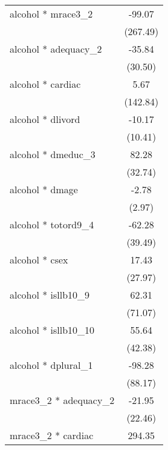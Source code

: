 {\begin{tabular}{l*{1}{c}}
alcohol * mrace3\_2                                &      -99.07\\
                                                  &    (267.49)\\
alcohol * adequacy\_2                              &      -35.84\\
                                                  &     (30.50)\\
alcohol * cardiac                                 &        5.67\\
                                                  &    (142.84)\\
alcohol * dlivord                                 &      -10.17\\
                                                  &     (10.41)\\
alcohol * dmeduc\_3                                &       82.28\\
                                                  &     (32.74)\\
alcohol * dmage                                   &       -2.78\\
                                                  &      (2.97)\\
alcohol * totord9\_4                               &      -62.28\\
                                                  &     (39.49)\\
alcohol * csex                                    &       17.43\\
                                                  &     (27.97)\\
alcohol * isllb10\_9                               &       62.31\\
                                                  &     (71.07)\\
alcohol * isllb10\_10                              &       55.64\\
                                                  &     (42.38)\\
alcohol * dplural\_1                               &      -98.28\\
                                                  &     (88.17)\\
mrace3\_2 * adequacy\_2                             &      -21.95\\
                                                  &     (22.46)\\
mrace3\_2 * cardiac                                &      294.35\\

\end{tabular}}
